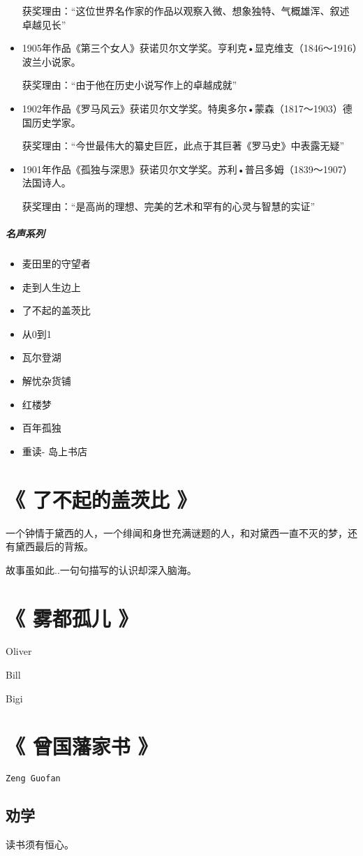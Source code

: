 \documentclass[UTF8,a4paper,8pt]{ctexbook}
\begin{document}
\begin{itemize}
			获奖理由：“这位世界名作家的作品以观察入微、想象独特、气概雄浑、叙述卓越见长”
			\item 1905年作品《第三个女人》获诺贝尔文学奖。亨利克•显克维支（1846～1916）波兰小说家。
			
			获奖理由：“由于他在历史小说写作上的卓越成就”
			\item 1902年作品《罗马风云》获诺贝尔文学奖。特奥多尔•蒙森（1817～1903）德国历史学家。
			
			获奖理由：“今世最伟大的纂史巨匠，此点于其巨著《罗马史》中表露无疑”
			\item 1901年作品《孤独与深思》获诺贝尔文学奖。苏利•普吕多姆（1839～1907）法国诗人。
			
			获奖理由：“是高尚的理想、完美的艺术和罕有的心灵与智慧的实证” 
		\end{itemize}
	
		\subparagraph{名声系列}
		\begin{itemize}
			\item 麦田里的守望者
			\item 走到人生边上
			\item 了不起的盖茨比
			\item 从0到1
			\item 瓦尔登湖
			\item 解忧杂货铺
			\item 红楼梦
			\item 百年孤独
			\item 重读- 岛上书店
		\end{itemize}
		
	\section{《 了不起的盖茨比  》  }  
		一个钟情于黛西的人，一个绯闻和身世充满谜题的人，和对黛西一直不灭的梦，还有黛西最后的背叛。
		
		故事虽如此..一句句描写的认识却深入脑海。
	
	\section{《 雾都孤儿 》  }  	
		Oliver
		
		Bill
		
		Bigi
	
	\section{《 曾国藩家书 》   }	
		\verb|Zeng Guofan |
		\subsection{劝学}
			读书须有恒心。
			
\end{document}
